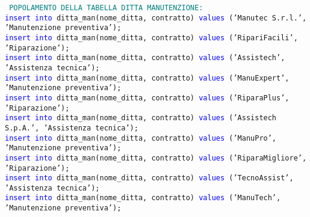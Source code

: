 \documentclass{article}
\begin{document}
    \begin{flushleft}
        \texttt{
        \textcolor{teal}{POPOLAMENTO DELLA TABELLA DITTA MANUTENZIONE:} \\
        \hspace*{0.5em}\textcolor{blue}{insert into} ditta\_man(nome\_ditta, contratto) \textcolor{blue}{values} ('Manutec S.r.l.', \hspace*{0.5em}'Manutenzione preventiva'); \\
        \hspace*{0.5em}\textcolor{blue}{insert into} ditta\_man(nome\_ditta, contratto) \textcolor{blue}{values} ('RipariFacili', \hspace*{0.5em}'Riparazione'); \\
        \hspace*{0.5em}\textcolor{blue}{insert into} ditta\_man(nome\_ditta, contratto) \textcolor{blue}{values} ('Assistech', 'Assistenza \hspace*{0.5em}tecnica'); \\
        \hspace*{0.5em}\textcolor{blue}{insert into} ditta\_man(nome\_ditta, contratto) \textcolor{blue}{values} ('ManuExpert', \hspace*{0.5em}'Manutenzione preventiva'); \\
        \hspace*{0.5em}\textcolor{blue}{insert into} ditta\_man(nome\_ditta, contratto) \textcolor{blue}{values} ('RiparaPlus', \hspace*{0.5em}'Riparazione'); \\
        \hspace*{0.5em}\textcolor{blue}{insert into} ditta\_man(nome\_ditta, contratto) \textcolor{blue}{values} ('Assistech S.p.A.', \hspace*{0.5em}'Assistenza tecnica'); \\
        \hspace*{0.5em}\textcolor{blue}{insert into} ditta\_man(nome\_ditta, contratto) \textcolor{blue}{values} ('ManuPro', 'Manutenzione \hspace*{0.5em}preventiva'); \\
        \hspace*{0.5em}\textcolor{blue}{insert into} ditta\_man(nome\_ditta, contratto) \textcolor{blue}{values} ('RiparaMigliore', \hspace*{0.5em}'Riparazione'); \\
        \hspace*{0.5em}\textcolor{blue}{insert into} ditta\_man(nome\_ditta, contratto) \textcolor{blue}{values} ('TecnoAssist', 'Assistenza \hspace*{0.5em}tecnica'); \\
        \hspace*{0.5em}\textcolor{blue}{insert into} ditta\_man(nome\_ditta, contratto) \textcolor{blue}{values} ('ManuTech', 'Manutenzione \hspace*{0.5em}preventiva'); \\}
    \end{flushleft}
\end{document}
